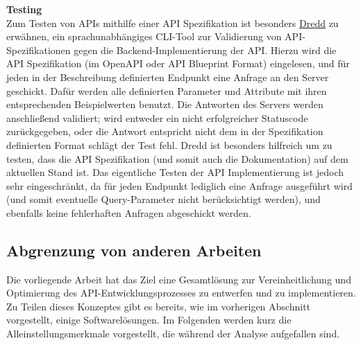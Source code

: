 \textbf{Testing}\\
Zum Testen von APIs mithilfe einer API Spezifikation ist besonders \href{http://dredd.io/}{Dredd} zu erwähnen, ein sprachunabhängiges CLI-Tool zur Validierung von API-Spezifikationen gegen die Backend-Implementierung der API. Hierzu wird die API Spezifikation (im OpenAPI oder API Blueprint Format) eingelesen, und für jeden in der Beschreibung definierten Endpunkt eine Anfrage an den Server geschickt. Dafür werden alle definierten Parameter und Attribute mit ihren entsprechenden Beispielwerten benutzt. Die Antworten des Servers werden anschließend validiert; wird entweder ein nicht erfolgreicher Statuscode zurückgegeben, oder die Antwort entspricht nicht dem in der Spezifikation definierten Format schlägt der Test fehl. Dredd ist besonders hilfreich um zu testen, dass die API Spezifikation (und somit auch die Dokumentation) auf dem aktuellen Stand ist. Das eigentliche Testen der API Implementierung ist jedoch sehr eingeschränkt, da für jeden Endpunkt lediglich eine Anfrage ausgeführt wird (und somit eventuelle Query-Parameter nicht berücksichtigt werden), und ebenfalls keine fehlerhaften Anfragen abgeschickt werden.

\subsection{Abgrenzung von anderen Arbeiten}

Die vorliegende Arbeit hat das Ziel eine Gesamtlösung zur Vereinheitlichung und Optimierung des API-Entwicklungsprozesses zu entwerfen und zu implementieren. Zu Teilen dieses Konzeptes gibt es bereits, wie im vorherigen Abschnitt vorgestellt, einige Softwarelösungen. Im Folgenden werden kurz die Alleinstellungsmerkmale vorgestellt, die während der Analyse aufgefallen sind.\\

